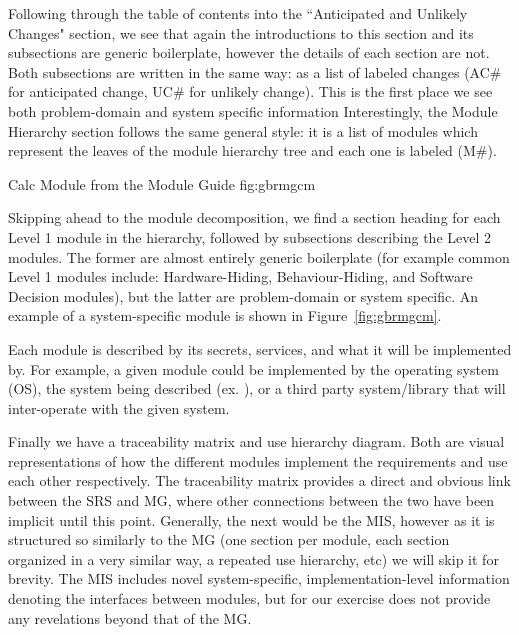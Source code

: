 Following through the table of contents into the ``Anticipated and Unlikely 
Changes" section, we see that again the introductions to this section and 
its subsections are generic boilerplate, however the details of each section 
are not. Both subsections are written in the same way: as a list of labeled 
changes (AC\# for anticipated change, UC\# for unlikely change). This is the 
first place we see both problem-domain and system specific information 
Interestingly, the Module Hierarchy section follows the same general style: it 
is a list of modules which represent the leaves of the module hierarchy tree 
and each one is labeled (M\#).

{Calc Module from the \gb{} Module Guide}
{fig:gbrmgcm}

Skipping ahead to the module decomposition, we find a section heading for each 
Level 1 module in the hierarchy, followed by subsections describing the Level 2 
modules. The former are almost entirely generic boilerplate (for example common 
Level 1 modules include: Hardware-Hiding, Behaviour-Hiding, and 
Software Decision modules), but the latter are problem-domain or system 
specific. An example of a system-specific module is shown in 
Figure~\ref{fig:gbrmgcm}. 

Each module is described by its secrets, services, and what it will be 
implemented by. For example, a given module could be implemented by the 
operating system (OS), the system being described (ex. \gb{}), or a third party 
system/library that will inter-operate with the given system.

Finally we have a traceability matrix and use hierarchy diagram. Both are 
visual representations of how the different modules implement the requirements 
and use each other respectively. The traceability matrix provides a direct and 
obvious link between the SRS and MG, where other connections between the two 
\sfs{} have been implicit until this point. Generally, the next \sf{} would be 
the MIS, however as it is structured so similarly to the MG (one section per 
module, each section organized in a very similar way, a repeated use hierarchy, 
etc) we will skip it for brevity. The MIS includes novel system-specific, 
implementation-level information denoting the interfaces between modules, but 
for our exercise does not provide any revelations beyond that of the MG.


